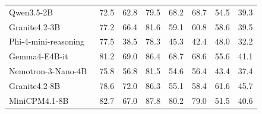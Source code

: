 {\begin{table}[!htbp]
\begin{tabularx}{\textwidth}{@{}Y r r r r r r r @{}}
Qwen3.5-2B~\cite{qwen35} & 72.5 & 62.8 & 79.5 & 68.2 & 68.7 & 54.5 & 39.3 \\
Granite4.2-3B~\cite{granite42} & 77.2 & 66.4 & 81.6 & 59.1 & 60.8 & 58.6 & 39.5 \\
Phi-4-mini-reasoning~\cite{phi4mini} & 77.5 & 38.5 & 78.3 & 45.3 & 42.4 & 48.0 & 32.2 \\
Gemma4-E4B-it~\cite{gemma4} & 81.2 & 69.0 & 86.4 & 68.7 & 68.6 & 55.6 & 41.1 \\
Nemotron-3-Nano-4B~\cite{nemotron3nano} & 75.8 & 56.8 & 81.5 & 54.6 & 56.4 & 43.4 & 37.4 \\
Granite4.2-8B~\cite{granite42} & 78.6 & 72.0 & 86.3 & 55.1 & 58.4 & 61.6 & 45.7 \\
MiniCPM4.1-8B~\cite{minicpm41} & 82.7 & 67.0 & 87.8 & 80.2 & 79.0 & 51.5 & 40.6 \\
\bottomrule
\end{tabularx}
\end{table}
}

